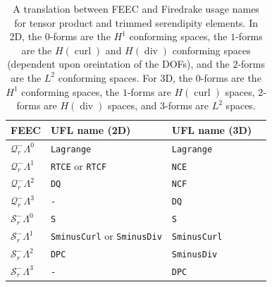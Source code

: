 \documentclass[format=acmsmall,screen,timestamp=false,a4paper]{acmart}
\DeclareMathOperator{\Div}{div}
\DeclareMathOperator{\curl}{curl}
\newcommand\justin[1]{\textbf{\textcolor[rgb]{0,1,0.5}{[Justin: #1]}}}
\newcommand\lm[1]{\textbf{\textcolor[rgb]{1,0,0.5}{[Lawrence: #1]}}}
\newcommand{\hcurl}{\ensuremath{{H}(\curl)}\xspace}
\newcommand{\hdiv}{\ensuremath{{H}(\Div)}\xspace}
\begin{document}


\begin{table}[htbp]
  \centering
\begin{tabular}{llll}
  \toprule
   FEEC & UFL name (2D) & UFL name (3D) \\
  \midrule
  $\mathcal{Q}^-_r \Lambda^0$ & \texttt{Lagrange} & \texttt{Lagrange}  \\
   $\mathcal{Q}^-_r \Lambda^1$ & \texttt{RTCE} or \texttt{RTCF} & \texttt{NCE} \\
   $\mathcal{Q}^-_r \Lambda^2$ & \texttt{DQ} & \texttt{NCF}  \\
  $\mathcal{Q}^-_r \Lambda^3$ & \texttt{-} & \texttt{DQ}\\
  \midrule
  $\mathcal{S}^-_r \Lambda^0 $ & \texttt{S} & \texttt{S}  \\
  $\mathcal{S}^-_r \Lambda^1$ & \texttt{SminusCurl} or \texttt{SminusDiv} & \texttt{SminusCurl}  \\
  $\mathcal{S}^-_r \Lambda^2$ & \texttt{DPC} & \texttt{SminusDiv}\\
  $\mathcal{S}^-_r \Lambda^3$ & \texttt{-} & \texttt{DPC}\\
  \bottomrule
\end{tabular}
\caption{A translation between FEEC and Firedrake usage names for tensor product and trimmed serendipity elements.  In 2D, the $0$-forms are the $H^1$ conforming spaces, the $1$-forms are the \hcurl and \hdiv conforming spaces (dependent upon oreintation of the DOFs), and the $2$-forms are the $L^2$ conforming spaces.  For 3D, the $0$-forms are the $H^1$ conforming spaces, the $1$-forms are \hcurl spaces, $2$-forms are \hdiv spaces, and $3$-forms are $L^2$ spaces. \label{tab:FiredrakeNames}}
\end{table}
\end{document}
